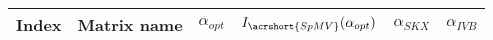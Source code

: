 \begin{tabular}{|l|l|S[round-mode=places,round-precision=4]|S[round-mode=places,round-precision=4]|S[round-mode=places,round-precision=4]|S[round-mode=places,round-precision=4]|}
\toprule
{Index} & {Matrix name} &  {$\alpha_{opt}$} & {$I_{\acrshort{SpMV}}(\alpha_{opt})$} & {$\alpha_{SKX}$} & {$\alpha_{IVB}$}  \\
\midrule
\bottomrule
\end{tabular}


